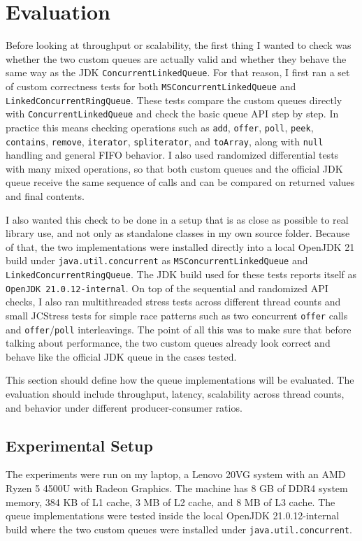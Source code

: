 \section{Evaluation}
Before looking at throughput or scalability, the first thing I wanted to check was whether the two custom queues are actually valid and whether they behave the same way as the JDK \texttt{ConcurrentLinkedQueue}. For that reason, I first ran a set of custom correctness tests for both \texttt{MSConcurrentLinkedQueue} and \texttt{LinkedConcurrentRingQueue}. These tests compare the custom queues directly with \texttt{ConcurrentLinkedQueue} and check the basic queue API step by step. In practice this means checking operations such as \texttt{add}, \texttt{offer}, \texttt{poll}, \texttt{peek}, \texttt{contains}, \texttt{remove}, \texttt{iterator}, \texttt{spliterator}, and \texttt{toArray}, along with \texttt{null} handling and general FIFO behavior. I also used randomized differential tests with many mixed operations, so that both custom queues and the official JDK queue receive the same sequence of calls and can be compared on returned values and final contents.

I also wanted this check to be done in a setup that is as close as possible to real library use, and not only as standalone classes in my own source folder. Because of that, the two implementations were installed directly into a local OpenJDK 21 build under \texttt{java.util.concurrent} as \texttt{MSConcurrentLinkedQueue} and \texttt{LinkedConcurrentRingQueue}. The JDK build used for these tests reports itself as \texttt{OpenJDK 21.0.12-internal}. On top of the sequential and randomized API checks, I also ran multithreaded stress tests across different thread counts and small JCStress tests for simple race patterns such as two concurrent \texttt{offer} calls and \texttt{offer}/\texttt{poll} interleavings. The point of all this was to make sure that before talking about performance, the two custom queues already look correct and behave like the official JDK queue in the cases tested.

This section should define how the queue implementations will be evaluated. The evaluation should include throughput, latency, scalability across thread counts, and behavior under different producer-consumer ratios.

\subsection{Experimental Setup}
The experiments were run on my laptop, a Lenovo 20VG system with an AMD Ryzen 5 4500U with Radeon Graphics. The machine has 8 GB of DDR4 system memory, 384 KB of L1 cache, 3 MB of L2 cache, and 8 MB of L3 cache. The queue implementations were tested inside the local OpenJDK 21.0.12-internal build where the two custom queues were installed under \texttt{java.util.concurrent}.

